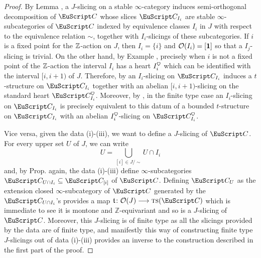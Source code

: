 \begin{proof}
By Lemma , a $J$-slicing on a stable $\infty$-category induces semi-orthogonal decomposition of $\C$ whose slices $\C_{I_i}$ are stable  $\infty$-subcategories of $\C$ indexed by equivalence classes $I_i$ in $J$ with respect to the equivalence relation $\sim$, together with $I_i$-slicings of these subcategories.
If $i$ is a fixed point for the $\mathbb{Z}$-action on $J$, then $I_i=\{i\}$ and $\mathcal{O}(I_i)=[\mathbf{1}]$ so that a $I_j$-slicing is trivial. On the other hand, by Example , precisely when $i$ is not a fixed point of the $\mathbb{Z}$-action the interval $I_i$ has a heart $I_i^\heart$ which can be identified with the interval $[i,i+1)$ of $J$. Therefore, by \aprop{} an $I_i$-slicing on $\C_{I_i}$ induces a $t$-structure on $\C_{I_i}$ together with an abelian $[i,i+1)$-slicing on the standard heart $\C_{I_i}^\heart$. Moreover, by \aprop{}, in the finite type case an $I_i$-slicing on $\C_{I_i}$ is precisely equivalent to this datum of a bounded $t$-structure on $\C_{I_i}$ with an abelian $I_i^\heart$-slicing on $\C_{I_i}^\heart$. 
\par
Vice versa, given the data (i)-(iii), we want to define a $J$-slicing of $\C$. For every upper set $U$ of $J$, we can write 
\[
U=\bigcup_{[i]\in J/\sim}U\cap I_i
\]
and, by Prop.  again, the data (i)-(iii) define $\infty$-subcategories $\C_{U\cap I_i}\subseteq \C_{[i]}$ of $\C$. Defining $\C_U$ as the extension closed $\infty$-subcategory of $\C$ generated by the $\C_{U\cap I_i}$'s provides a map $\tee\colon \O(J)\to \ts(\C)$ which is immediate to see it is montone and $\mathbb{Z}$-equivariant and so is a $J$-slicing of $\C$. Moreover, this $J$-slicing is of finite type as all the slicings provided by the data are of finite type, and manifestly this way of constructing  finite type $J$-slicings out of
data (i)-(iii) provides an inverse to the construction described in the first part of the proof.  
\end{proof}